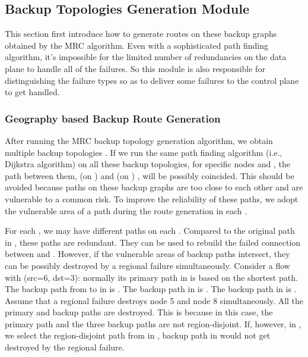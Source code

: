 \documentclass[10pt,journal]{IEEEtran}
\begin{document}
\subsection{Backup Topologies Generation Module}
This section first introduce how to generate routes on these backup graphs  obtained by the MRC algorithm. Even with a sophisticated path finding algorithm, it's impossible for the limited number of redundancies on the data plane to handle all of the failures. So this module is also responsible for distinguishing the failure types so as to deliver some failures to the control plane to get handled.
\subsubsection{Geography based Backup Route Generation}
After running the MRC backup topology generation algorithm, we obtain multiple backup topologies . If we run the same path finding algorithm (i.e., Dijkstra algorithm) on all these backup topologies, for specific nodes  and , the path between them,  (on ) and  (on ) , will be possibly coincided. This should be avoided because paths on these backup graphs are too close to each other and are vulnerable to a common risk. To improve the reliability of these paths,
we adopt the vulnerable area of  a path during the route generation in each .

For each , we may have different paths on each . Compared to the original path in , these paths are redundant. They can be used to rebuild the failed connection between  and . However, if the vulnerable areas of backup paths intersect, they can be possibly destroyed by a regional failure simultaneously.
Consider a flow with (src=6, dst=3): normally its primary path in  is  based on the shortest path. The backup path from  to  in  is . The backup path in  is . The backup path in  is . Assume that a regional failure destroys node 5 and node 8 simultaneously. All the primary and backup paths are destroyed. This is because in this case, the primary path and the three backup paths are not region-disjoint. If, however, in , we select the region-disjoint path  from  in , backup path in  would not get destroyed by the regional failure.
\end{document}
